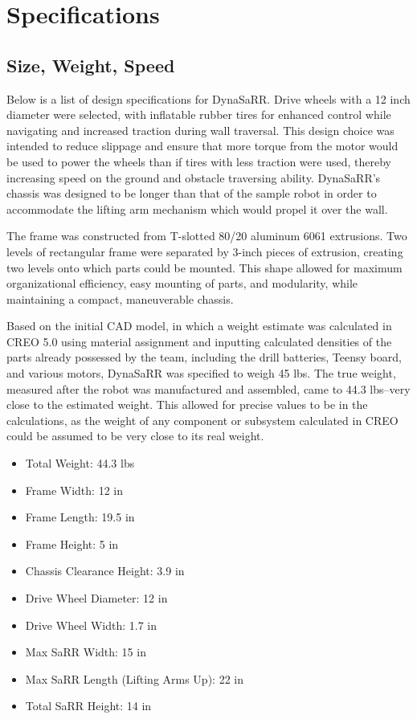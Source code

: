 \section{Specifications}
\subsection{Size, Weight, Speed}
Below is a list of design specifications for DynaSaRR. Drive wheels with a 12 inch diameter were selected, with inflatable rubber tires for enhanced control while navigating and increased traction during wall traversal. This design choice was intended to reduce slippage and ensure that more torque from the motor would be used to power the wheels than if tires with less traction were used, thereby increasing speed on the ground and obstacle traversing ability. DynaSaRR's chassis was designed to be longer than that of the sample robot in order to accommodate the lifting arm mechanism which would propel it over the wall.

The frame was constructed from T-slotted 80/20 aluminum 6061 extrusions. Two levels of rectangular frame were separated by 3-inch pieces of extrusion, creating two levels onto which parts could be mounted. This shape allowed for maximum organizational efficiency, easy mounting of parts, and modularity, while maintaining a compact, maneuverable chassis.

Based on the initial CAD model, in which a weight estimate was calculated in CREO 5.0 using material assignment and inputting calculated densities of the parts already possessed by the team, including the drill batteries, Teensy board, and various motors, DynaSaRR was specified to weigh 45 lbs. The true weight, measured after the robot was manufactured and assembled, came to 44.3 lbs--very close to the estimated weight. This allowed for precise values to be in the calculations, as the weight of any component or subsystem calculated in CREO could be assumed to be very close to its real weight.


\begin{itemize}
    \item Total Weight: 44.3 lbs
    \item Frame Width: 12 in
    \item Frame Length: 19.5 in
    \item Frame Height: 5 in
    \item Chassis Clearance Height: 3.9 in
    \item Drive Wheel Diameter: 12 in
    \item Drive Wheel Width: 1.7 in
    \item Max SaRR Width: 15 in
    \item Max SaRR Length (Lifting Arms Up): 22 in
    \item Total SaRR Height: 14 in
\end{itemize}

